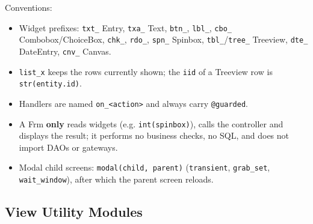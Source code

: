Conventions:

\begin{itemize}
\tightlist
\item
  Widget prefixes: \texttt{txt\_\allowbreak{}} Entry, \texttt{txa\_\allowbreak{}} Text,
  \texttt{btn\_\allowbreak{}}, \texttt{lbl\_\allowbreak{}}, \texttt{cbo\_\allowbreak{}} Combobox/ChoiceBox,
  \texttt{chk\_\allowbreak{}}, \texttt{rdo\_\allowbreak{}}, \texttt{spn\_\allowbreak{}} Spinbox,
  \texttt{tbl\_\allowbreak{}}/\texttt{tree\_\allowbreak{}} Treeview, \texttt{dte\_\allowbreak{}} DateEntry,
  \texttt{cnv\_\allowbreak{}} Canvas.
\item
  \texttt{list\_\allowbreak{}x} keeps the rows currently shown; the \texttt{iid} of a
  Treeview row is \texttt{str(\allowbreak{}entity.\allowbreak{}id)}.
\item
  Handlers are named \texttt{on\_\allowbreak{}\textless{}action\textgreater{}\allowbreak{}} and
  always carry \texttt{@guarded}.
\item
  A Frm \textbf{only} reads widgets (e.g. \texttt{int(\allowbreak{}spinbox)}), calls
  the controller and displays the result; it performs no business
  checks, no SQL, and does not import DAOs or gateways.
\item
  Modal child screens: \texttt{modal(\allowbreak{}child,\allowbreak{} parent)}
  (\texttt{transient}, \texttt{grab\_\allowbreak{}set}, \texttt{wait\_\allowbreak{}window}), after
  which the parent screen reloads.
\end{itemize}

\hypertarget{view-utility-modules}{%
\subsection{View Utility Modules}\label{view-utility-modules}}

